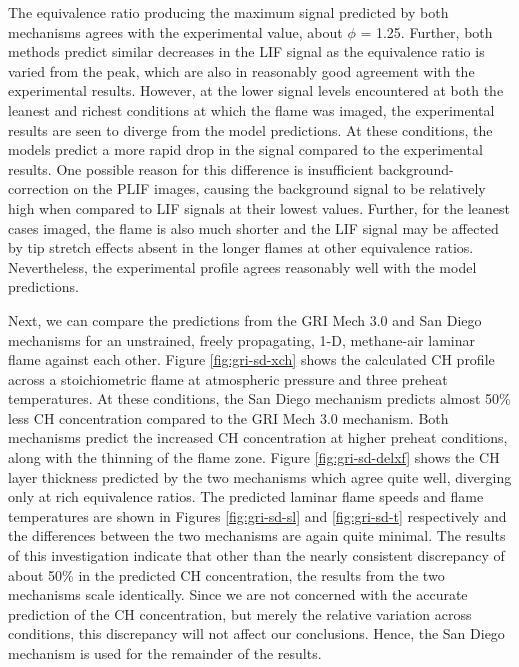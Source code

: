 

The equivalence ratio producing the maximum signal predicted by both mechanisms agrees with the experimental value, about \(\phi\) = 1.25.
Further, both methods predict similar decreases in the LIF signal as the equivalence ratio is varied from the peak, which are also in reasonably good agreement with the experimental results.
However, at the lower signal levels encountered at both the leanest and richest conditions at which the flame was imaged, the experimental results are seen to diverge from the model predictions.
At these conditions, the models predict a more rapid drop in the signal compared to the experimental results.
One possible reason for this difference is insufficient background-correction on the PLIF images, causing the background signal to be relatively high when compared to LIF signals at their lowest values.
Further, for the leanest cases imaged, the flame is also much shorter and the LIF signal may be affected by tip stretch effects absent in the longer flames at other equivalence ratios.
Nevertheless, the experimental profile agrees reasonably well with the model predictions.

Next, we can compare the predictions from the GRI Mech 3.0 and San Diego mechanisms for an unstrained, freely propagating, 1-D, methane-air laminar flame against each other.
Figure \ref{fig:gri-sd-xch} shows the calculated CH profile across a stoichiometric flame at atmospheric pressure and three preheat temperatures.
At these conditions, the San Diego mechanism predicts almost 50\% less CH concentration compared to the GRI Mech 3.0 mechanism.
Both mechanisms predict the increased CH concentration at higher preheat conditions, along with the thinning of the flame zone.
Figure \ref{fig:gri-sd-delxf} shows the CH layer thickness predicted by the two mechanisms which agree quite well, diverging only at rich equivalence ratios.
The predicted laminar flame speeds and flame temperatures are shown in Figures \ref{fig:gri-sd-sl} and \ref{fig:gri-sd-t} respectively and the differences between the two mechanisms are again quite minimal.
The results of this investigation indicate that other than the nearly consistent discrepancy of about 50\% in the predicted CH concentration, the results from the two mechanisms scale identically.
Since we are not concerned with the accurate prediction of the CH concentration, but merely the relative variation across conditions, this discrepancy will not affect our conclusions.
Hence, the San Diego mechanism is used for the remainder of the results.

